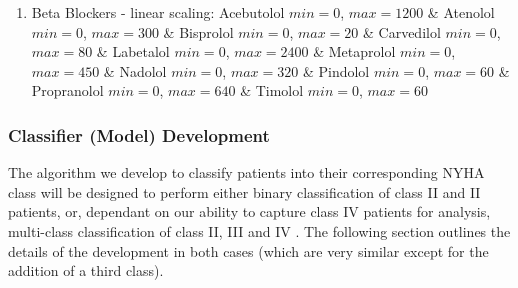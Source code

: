 \documentclass[]{article}
\providecommand{\e}[1]{\ensuremath{\times 10^{#1}}}  %
\begin{document}
\begin{enumerate}
\begin{enumerate}
		\item Beta Blockers - linear scaling: Acebutolol \(min = 0\), \(max = 1200\) \cite{Medscape} \linebreak \& Atenolol \(min = 0\), \(max = 300\)  %
		\& Bisprolol \(min = 0\), \(max = 20\)  %
		\linebreak \& Carvedilol \(min = 0\), \(max = 80\)  %
		\& Labetalol \(min = 0\), \(max = 2400\)  %
		\& Metaprolol \(min = 0\), \(max = 450\)  %
		\& Nadolol \(min = 0\), \(max = 320\)  %
		\linebreak \& Pindolol \(min = 0\), \(max = 60\)  %
		\& Propranolol \(min = 0\), \(max = 640\)  %
		\& Timolol \(min = 0\), \(max = 60\)  %
		\cite{McAuley2017,HeartandStrokeFoundation2017}
		
%		
%		
	\end{enumerate} 
\end{enumerate}

\subsubsection{Classifier (Model) Development}

The algorithm we develop to classify patients into their corresponding NYHA class will be designed to perform either binary classification of class II and II patients, or, dependant on our ability to capture class IV patients for analysis, multi-class classification of class II, III and IV . The following section outlines the details of the development in both cases (which are very similar except for the addition of a third class).
\end{document}
